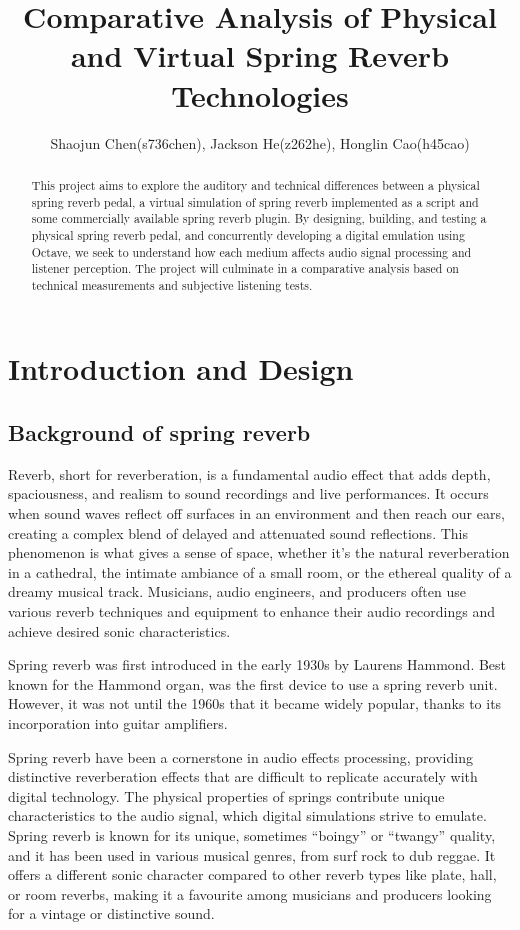 \documentclass[12pt]{article}
\title{Comparative Analysis of Physical and Virtual Spring Reverb Technologies}
\author{
    Shaojun Chen(s736chen), Jackson He(z262he), Honglin Cao(h45cao) \\
}
\date{\displaydate{date}}
\begin{document}
\maketitle

\begin{abstract}
This project aims to explore the auditory and technical differences between a physical spring reverb pedal, a virtual simulation of spring reverb implemented as a script and some commercially available spring reverb plugin. By designing, building, and testing a physical spring reverb pedal, and concurrently developing a digital emulation using Octave, we seek to understand how each medium affects audio signal processing and listener perception. The project will culminate in a comparative analysis based on technical measurements and subjective listening tests.
\end{abstract}

\tableofcontents
\newpage

\section{Introduction and Design}
\subsection{Background of spring reverb}

Reverb, short for reverberation, is a fundamental audio effect that adds depth, spaciousness, and realism to sound recordings and live performances. It occurs when sound waves reflect off surfaces in an environment and then reach our ears, creating a complex blend of delayed and attenuated sound reflections. This phenomenon is what gives a sense of space, whether it's the natural reverberation in a cathedral, the intimate ambiance of a small room, or the ethereal quality of a dreamy musical track. Musicians, audio engineers, and producers often use various reverb techniques and equipment to enhance their audio recordings and achieve desired sonic characteristics.

Spring reverb was first introduced in the early 1930s by Laurens Hammond. Best known for the Hammond organ, was the first device to use a spring reverb unit. However, it was not until the 1960s that it became widely popular, thanks to its incorporation into guitar amplifiers.

Spring reverb have been a cornerstone in audio effects processing, providing distinctive reverberation effects that are difficult to replicate accurately with digital technology. The physical properties of springs contribute unique characteristics to the audio signal, which digital simulations strive to emulate.
Spring reverb is known for its unique, sometimes ``boingy'' or ``twangy'' quality, and it has been used in various musical genres, from surf rock to dub reggae. It offers a different sonic character compared to other reverb types like plate, hall, or room reverbs, making it a favourite among musicians and producers looking for a vintage or distinctive sound.
\end{document}
